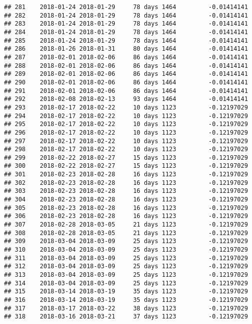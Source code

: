 \documentclass[]{article}
\begin{document}
\begin{verbatim}
## 281    2018-01-24 2018-01-29     78 days 1464         -0.01414141
## 282    2018-01-24 2018-01-29     78 days 1464         -0.01414141
## 283    2018-01-24 2018-01-29     78 days 1464         -0.01414141
## 284    2018-01-24 2018-01-29     78 days 1464         -0.01414141
## 285    2018-01-24 2018-01-29     78 days 1464         -0.01414141
## 286    2018-01-26 2018-01-31     80 days 1464         -0.01414141
## 287    2018-02-01 2018-02-06     86 days 1464         -0.01414141
## 288    2018-02-01 2018-02-06     86 days 1464         -0.01414141
## 289    2018-02-01 2018-02-06     86 days 1464         -0.01414141
## 290    2018-02-01 2018-02-06     86 days 1464         -0.01414141
## 291    2018-02-01 2018-02-06     86 days 1464         -0.01414141
## 292    2018-02-08 2018-02-13     93 days 1464         -0.01414141
## 293    2018-02-17 2018-02-22     10 days 1123         -0.12197029
## 294    2018-02-17 2018-02-22     10 days 1123         -0.12197029
## 295    2018-02-17 2018-02-22     10 days 1123         -0.12197029
## 296    2018-02-17 2018-02-22     10 days 1123         -0.12197029
## 297    2018-02-17 2018-02-22     10 days 1123         -0.12197029
## 298    2018-02-17 2018-02-22     10 days 1123         -0.12197029
## 299    2018-02-22 2018-02-27     15 days 1123         -0.12197029
## 300    2018-02-22 2018-02-27     15 days 1123         -0.12197029
## 301    2018-02-23 2018-02-28     16 days 1123         -0.12197029
## 302    2018-02-23 2018-02-28     16 days 1123         -0.12197029
## 303    2018-02-23 2018-02-28     16 days 1123         -0.12197029
## 304    2018-02-23 2018-02-28     16 days 1123         -0.12197029
## 305    2018-02-23 2018-02-28     16 days 1123         -0.12197029
## 306    2018-02-23 2018-02-28     16 days 1123         -0.12197029
## 307    2018-02-28 2018-03-05     21 days 1123         -0.12197029
## 308    2018-02-28 2018-03-05     21 days 1123         -0.12197029
## 309    2018-03-04 2018-03-09     25 days 1123         -0.12197029
## 310    2018-03-04 2018-03-09     25 days 1123         -0.12197029
## 311    2018-03-04 2018-03-09     25 days 1123         -0.12197029
## 312    2018-03-04 2018-03-09     25 days 1123         -0.12197029
## 313    2018-03-04 2018-03-09     25 days 1123         -0.12197029
## 314    2018-03-04 2018-03-09     25 days 1123         -0.12197029
## 315    2018-03-14 2018-03-19     35 days 1123         -0.12197029
## 316    2018-03-14 2018-03-19     35 days 1123         -0.12197029
## 317    2018-03-17 2018-03-22     38 days 1123         -0.12197029
## 318    2018-03-16 2018-03-21     37 days 1123         -0.12197029

\end{verbatim}
\end{document}
